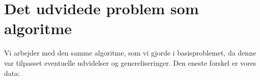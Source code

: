 \section{Det udvidede problem som algoritme}
Vi arbejder med den samme algoritme, som vi gjorde i basisproblemet, da denne var tilpasset eventuelle udvidelser og genereliseringer. Den eneste forskel er vores data:

 